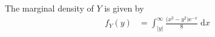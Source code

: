\documentclass[10pt]{article}
\begin{document}
\begin{itemize}
    The marginal density of \(Y\) is given by 
    \begin{align*}
        f_Y(y) &= \int_{|y|}^{\infty} \frac{\big( x^2 - y^2 \big) \mathrm{e}^{-x}}{8} \;\mathrm{d}x

\end{align*}
\end{itemize}
\end{document}
